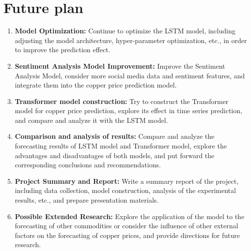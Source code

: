 \documentclass[project-plan]{report-template}
\begin{document}
\section{Future plan}
\begin{enumerate}
    \item \textbf{Model Optimization:} Continue to optimize the LSTM model, including adjusting the model architecture, hyper-parameter optimization, etc., in order to improve the prediction effect.
    
    \item \textbf{Sentiment Analysis Model Improvement:} Improve the Sentiment Analysis Model, consider more social media data and sentiment features, and integrate them into the copper price prediction model.
    
    \item \textbf{Transformer model construction:} Try to construct the Transformer model for copper price prediction, explore its effect in time series prediction, and compare and analyze it with the LSTM model.
    
    \item \textbf{Comparison and analysis of results:} Compare and analyze the forecasting results of LSTM model and Transformer model, explore the advantages and disadvantages of both models, and put forward the corresponding conclusions and recommendations.
    
    \item \textbf{Project Summary and Report:} Write a summary report of the project, including data collection, model construction, analysis of the experimental results, etc., and prepare presentation materials.
    
    \item \textbf{Possible Extended Research:} Explore the application of the model to the forecasting of other commodities or consider the influence of other external factors on the forecasting of copper prices, and provide directions for future research.
\end{enumerate}
\end{document}
